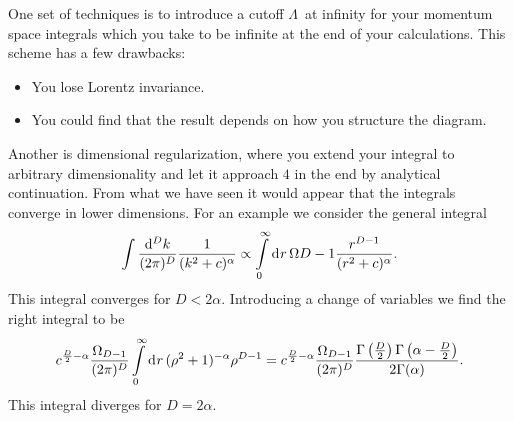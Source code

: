 One set of techniques is to introduce a cutoff $\Lambda$ at infinity for your momentum space integrals which you take to be infinite at the end of your calculations. This scheme has a few drawbacks:
\begin{itemize}
	\item You lose Lorentz invariance.
	\item You could find that the result depends on how you structure the diagram.
\end{itemize}

Another is dimensional regularization, where you extend your integral to arbitrary dimensionality and let it approach $4$ in the end by analytical continuation. From what we have seen it would appear that the integrals converge in lower dimensions. For an example we consider the general integral
\begin{align*}
	\int\limits_{}^{}\frac{\dd[D]{k}}{(2\pi)^{D}}\frac{1}{(k^{2} + c)^{\alpha}} \propto \int\limits_{0}^{\infty}\dd[]{r}\Omega{D - 1}\frac{r^{D - 1}}{(r^{2} + c)^{\alpha}}.
\end{align*}
This integral converges for $D < 2\alpha$. Introducing a change of variables we find the right integral to be
\begin{align*}
	c^{\frac{D}{2} - \alpha}\frac{\Omega_{D - 1}}{(2\pi)^{D}}\int\limits_{0}^{\infty}\dd[]{r}(\rho^{2} + 1)^{-\alpha}\rho^{D - 1} = c^{\frac{D}{2} - \alpha}\frac{\Omega_{D - 1}}{(2\pi)^{D}}\frac{\Gamma\left(\frac{D}{2}\right)\Gamma\left(\alpha - \frac{D}{2}\right)}{2\Gamma(\alpha)}.
\end{align*}
This integral diverges for $D = 2\alpha$.

